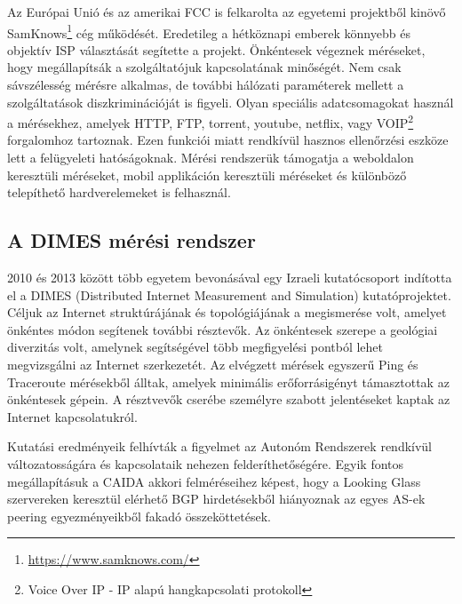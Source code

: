Az Európai Unió és az amerikai FCC is felkarolta az egyetemi projektből kinövő SamKnows\footnote{\url{https://www.samknows.com/}} cég működését. Eredetileg a hétköznapi emberek könnyebb és objektív ISP választását segítette a projekt. Önkéntesek végeznek méréseket, hogy megállapítsák a szolgáltatójuk kapcsolatának minőségét. Nem csak sávszélesség mérésre alkalmas, de további hálózati paraméterek mellett a szolgáltatások diszkriminációját is figyeli. Olyan speciális adatcsomagokat használ a mérésekhez, amelyek HTTP, FTP, torrent, youtube, netflix, vagy VOIP\footnote{Voice Over IP - IP alapú hangkapcsolati protokoll} forgalomhoz tartoznak. Ezen funkciói miatt rendkívül hasznos ellenőrzési eszköze lett a felügyeleti hatóságoknak.
Mérési rendszerük támogatja a weboldalon keresztüli méréseket, mobil applikáción keresztüli méréseket és különböző telepíthető hardverelemeket is felhasznál.


\subsection{A DIMES mérési rendszer}

2010 és 2013 között több egyetem bevonásával egy Izraeli kutatócsoport indította el a DIMES (Distributed Internet Measurement and Simulation) kutatóprojektet. Céljuk az Internet struktúrájának és topológiájának a megismerése volt, amelyet önkéntes módon segítenek további résztevők.
Az önkéntesek szerepe a geológiai diverzitás volt, amelynek segítségével több megfigyelési pontból lehet megvizsgálni az Internet szerkezetét.
Az elvégzett mérések egyszerű Ping és Traceroute mérésekből álltak, amelyek minimális erőforrásigényt támasztottak az önkéntesek gépein. A résztvevők cserébe személyre szabott jelentéseket kaptak az Internet kapcsolatukról.

Kutatási eredményeik felhívták a figyelmet az Autonóm Rendszerek rendkívül változatosságára és kapcsolataik nehezen felderíthetőségére. Egyik fontos megállapításuk a CAIDA akkori felméréseihez képest, hogy a Looking Glass szervereken keresztül elérhető BGP hirdetésekből hiányoznak az egyes AS-ek peering egyezményeikből fakadó összeköttetések.

